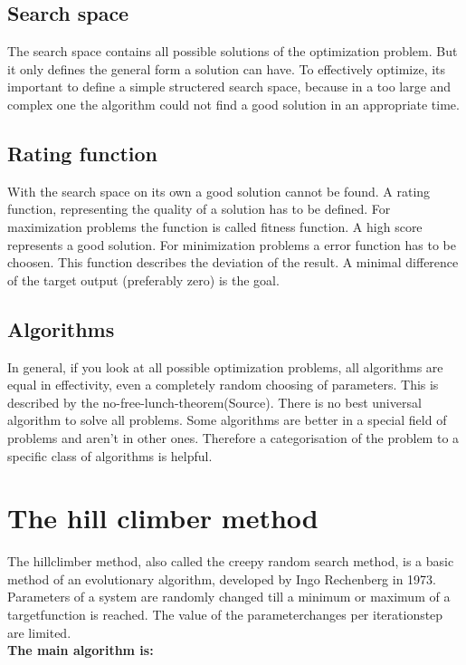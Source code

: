 \documentclass[10pt,a4paper,DIV=11]{scrreprt}
\begin{document}
\subsection{Search space}
The search space contains all possible solutions of the optimization problem. But it only defines the general form a solution can have. To effectively optimize, its important to define a simple structered search space, because in a too large and complex one the algorithm could not find a good solution in an appropriate time.

\subsection{Rating function}
With the search space on its own a good solution cannot be found. A rating function, representing the quality of a solution has to be defined. For maximization problems the function is called fitness function. A high score represents a good solution. For minimization problems a error function has to be choosen. This function describes the deviation of the result. A minimal difference of the target output (preferably zero) is the goal.

\subsection{Algorithms}
In general, if you look at all possible optimization problems, all algorithms are equal in effectivity, even a completely random choosing of parameters. This is described by the no-free-lunch-theorem(Source). There is no best universal algorithm to solve all problems. Some algorithms are better in a special field of problems and aren't in other ones. Therefore a categorisation of the problem to a specific class of algorithms is helpful.

\section{The hill climber method}
The hillclimber method, also called the creepy random search method, is a basic method of an evolutionary algorithm, developed by Ingo Rechenberg in 1973. %
Parameters of a system are randomly changed till a minimum or maximum of a targetfunction is reached. The value of the parameterchanges per iterationstep are limited. \\

\textbf{The main algorithm is:}
\end{document}
